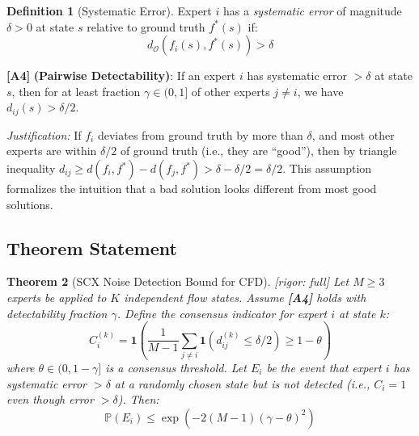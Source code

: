 \documentclass[11pt,a4paper]{article}
\newtheorem{theorem}{Theorem}[section]
\theoremstyle{definition}
\newtheorem{definition}[theorem]{Definition}
\theoremstyle{remark}
\newcommand{\rigorFull}{\textcolor{green!60!black}{[rigor: full]}}
\newcommand{\assumptionTag}[1]{\textsf{\textbf{[A#1]}}}
\newcommand{\Pbb}{\mathbb{P}}
\newcommand{\indicator}{\mathbf{1}}
\begin{document}
\begin{definition}[Systematic Error]
Expert $i$ has a \emph{systematic error} of magnitude $\delta > 0$ at state $s$ relative to ground truth $f^*(s)$ if:
\begin{equation}
d_{\mathcal{O}}(f_i(s), f^*(s)) > \delta
\label{eq:syserr}
\end{equation}
\end{definition}

\assumptionTag{4} \textbf{(Pairwise Detectability)}: If an expert $i$ has systematic error $> \delta$ at state $s$, then for at least fraction $\gamma \in (0, 1]$ of other experts $j \neq i$, we have $d_{ij}(s) > \delta/2$.

\textit{Justification:} If $f_i$ deviates from ground truth by more than $\delta$, and most other experts are within $\delta/2$ of ground truth (i.e., they are ``good''), then by triangle inequality $d_{ij} \geq d(f_i, f^*) - d(f_j, f^*) > \delta - \delta/2 = \delta/2$.
This assumption formalizes the intuition that a bad solution looks different from most good solutions.

\subsection{Theorem Statement}

\begin{theorem}[SCX Noise Detection Bound for CFD] \label{thm:noise}
\rigorFull
Let $M \geq 3$ experts be applied to $K$ independent flow states.
Assume \assumptionTag{4} holds with detectability fraction $\gamma$.
Define the consensus indicator for expert $i$ at state $k$:
\begin{equation}
C_i^{(k)} = \indicator\left( \frac{1}{M-1}\sum_{j \neq i} \indicator(d_{ij}^{(k)} \leq \delta/2) \geq 1 - \theta \right)
\label{eq:consensus}
\end{equation}
where $\theta \in (0, 1-\gamma]$ is a consensus threshold.
Let $E_i$ be the event that expert $i$ has systematic error $> \delta$ at a randomly chosen state but is not detected (i.e., $C_i = 1$ even though error $> \delta$).
Then:
\begin{equation}
\Pbb(E_i) \leq \exp\left( -2 (M-1) \left( \gamma - \theta \right)^2 \right)
\label{eq:noise_bound}
\end{equation}
\end{theorem}
\end{document}
